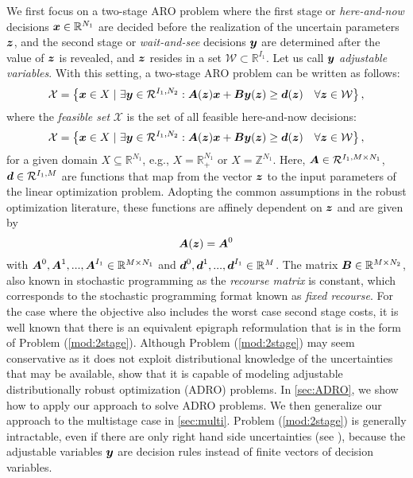 \documentclass[fleqn,isre,blindrev]{informs4}
\newcommand{\mb}[1]{\mbox{\boldmath \ensuremath{#1}}}
\renewcommand{\Re}{\mathbb{R}}
\begin{document}
We first focus on a two-stage ARO problem where the first stage or {\em here-and-now} decisions  $\mb{x} \in \Re^{N_1}$ are decided before the realization of the uncertain parameters $\mb{z}$,  {and} the second stage or {\em wait-and-see} decisions $\mb{y}$ are determined after the value of $\mb{z}$ is revealed, and $\mb{z}$ resides in a set $\mathcal{W} \subset \mathbb{R}^{I_1}$. Let us call $\mb{y}$ {\em adjustable variables}. With this setting, a two-stage ARO problem can be written as follows:
\begin{equation}
\label{mod:2stage}
\mathcal{X} = \left\{ \mb{x} \in X \hspace{3pt} | \hspace{3pt}  \exists \mb{y} \in \mathcal{R}^{I_1,N_2}: \mb{A}(\mb{z})\mb{x}+\mb{B}\mb{y}(\mb{z}) \geq\mb{d}(\mb{z})  \quad  \forall \mb{z} \in \mathcal{W} \right\},
\end{equation}
where the {\em feasible set} $\mathcal{X}$ is the set of all feasible here-and-now decisions:
\begin{equation}\label{set:X}
\mathcal{X} = \left\{ \mb{x} \in X \hspace{3pt} | \hspace{3pt}  \exists \mb{y} \in \mathcal{R}^{I_1,N_2}: \mb{A}(\mb{z})\mb{x}+\mb{B}\mb{y}(\mb{z}) \geq\mb{d}(\mb{z})  \quad  \forall \mb{z} \in \mathcal{W} \right\},
\end{equation}
for a given domain $X\subseteq \mathbb{R}^{N_1}$, e.g., $X= \mathbb{R}^{N_1}_+$  {or $X= \mathbb{Z}^{N_1}$}. Here,  $\mb{A} \in \mathcal{R}^{I_1,M \times N_1}$,  $\mb{d} \in \mathcal{R}^{I_1,M}$ are functions that map from the vector $\mb{z}$ to the input parameters of the linear optimization problem. Adopting the common assumptions in the robust optimization literature, these functions are affinely dependent on $\mb{z}$ and are given by
\begin{equation*}
\mb{A}(\mb{z}) = \mb{A}^0%
\end{equation*}
	with $\mb{A}^0, \mb{A}^1,..., \mb{A}^{I_1} \in \Re^{M \times N_1}$ and $\mb{d}^0, \mb{d}^1,..., \mb{d}^{I_1} \in \Re^{M}$. The matrix $\mb{B} \in \Re^{M \times N_2}$, also known in stochastic programming as the {\em recourse matrix} is constant, which corresponds to the stochastic programming format known as {\em fixed recourse}. For the case where the objective also includes the worst case second stage costs, it is well known that there is an equivalent epigraph reformulation that is in the form of Problem (\ref{mod:2stage}). Although Problem (\ref{mod:2stage}) may seem conservative as it does not exploit distributional knowledge of the uncertainties that may be available, \cite{bsz17} show that it is capable of modeling adjustable distributionally robust optimization (ADRO) problems. In \textsection \ref{sec:ADRO}, we show how to apply our approach to solve ADRO problems.  {We then generalize our approach to the multistage case in \textsection \ref{sec:multi}.} Problem (\ref{mod:2stage}) is generally intractable, even if there are only right hand side uncertainties (see \cite{m11}), because the adjustable variables $\mb{y}$ are decision rules instead of finite vectors of decision variables.
	
\end{document}
